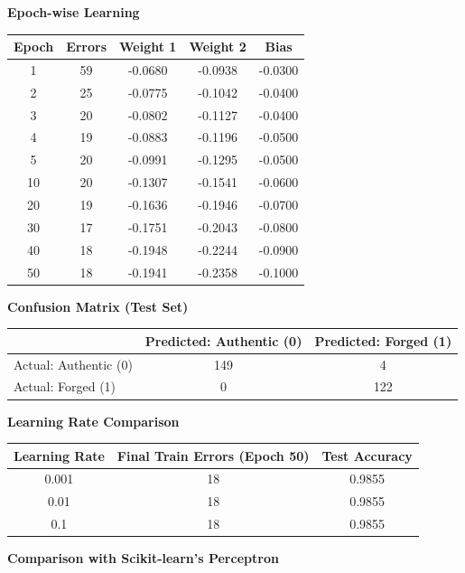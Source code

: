 \documentclass[11pt]{article}
\begin{document}
\vspace{3mm}

\textbf{Epoch-wise Learning}

\begin{tabular}{|c|c|c|c|c|}
\hline
Epoch & Errors & Weight 1 & Weight 2 & Bias\\
\hline
1 & 59 & -0.0680 & -0.0938 & -0.0300\\
2 & 25 & -0.0775 & -0.1042 & -0.0400\\
3 & 20 & -0.0802 & -0.1127 & -0.0400\\
4 & 19 & -0.0883 & -0.1196 & -0.0500\\
5 & 20 & -0.0991 & -0.1295 & -0.0500\\
10 & 20 & -0.1307 & -0.1541 & -0.0600\\
20 & 19 & -0.1636 & -0.1946 & -0.0700\\
30 & 17 & -0.1751 & -0.2043 & -0.0800\\
40 & 18 & -0.1948 & -0.2244 & -0.0900\\
50 & 18 & -0.1941 & -0.2358 & -0.1000\\
\hline
\end{tabular}

\vspace{3mm}

\textbf{Confusion Matrix (Test Set)}

\begin{tabular}{|p{4cm}|c|c|}
\hline
 & Predicted: Authentic (0) & Predicted: Forged (1)\\
\hline
Actual: Authentic (0) & 149 & 4\\
\hline
Actual: Forged (1) & 0 & 122\\
\hline
\end{tabular}

\vspace{3mm}

\textbf{Learning Rate Comparison}

\begin{tabular}{|c|c|c|}
\hline
Learning Rate & Final Train Errors (Epoch 50) & Test Accuracy\\
\hline
0.001 & 18 & 0.9855\\
0.01 & 18 & 0.9855\\
0.1 & 18 & 0.9855\\
\hline
\end{tabular}

\vspace{3mm}

\textbf{Comparison with Scikit-learn's Perceptron}
\end{document}
